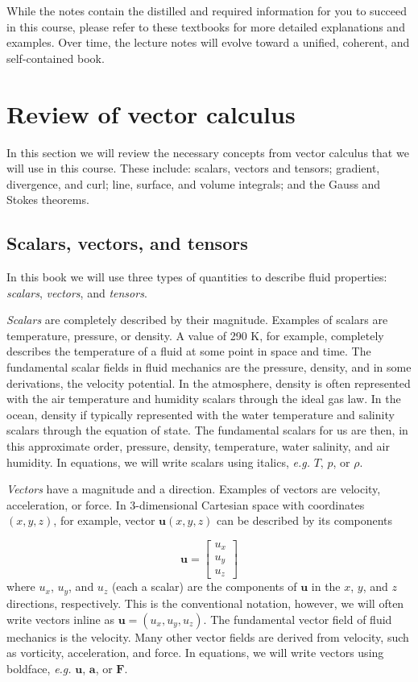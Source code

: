 \documentclass[12pt]{article}
\numberwithin{equation}{section}
\numberwithin{figure}{section}
\numberwithin{table}{section}
\begin{document}
While the notes contain the distilled and required information for you to
succeed in this course, please refer to these textbooks for more detailed
explanations and examples.
Over time, the lecture notes will evolve toward a unified, coherent, and
self-contained book.

\newpage
\section{Review of vector calculus}

In this section we will review the necessary concepts from vector calculus that
we will use in this course.
These include:
scalars, vectors and tensors;
gradient, divergence, and curl;
line, surface, and volume integrals;
and the Gauss and Stokes theorems.

\subsection{Scalars, vectors, and tensors}

In this book we will use three types of quantities to describe fluid
properties: \textit{scalars}, \textit{vectors}, and \textit{tensors}.

\textit{Scalars} are completely described by their magnitude.
Examples of scalars are temperature, pressure, or density.
A value of 290 K, for example, completely describes the temperature of a fluid
at some point in space and time.
The fundamental scalar fields in fluid mechanics are the pressure, density,
and in some derivations, the velocity potential.
In the atmosphere, density is often represented with the air temperature and
humidity scalars through the ideal gas law.
In the ocean, density if typically represented with the water temperature and
salinity scalars through the equation of state.
The fundamental scalars for us are then, in this approximate order,
pressure, density, temperature, water salinity, and air humidity.
In equations, we will write scalars using italics, \textit{e.g.} $T$, $p$, or $\rho$.

\textit{Vectors} have a magnitude and a direction.
Examples of vectors are velocity, acceleration, or force.
In 3-dimensional Cartesian space with coordinates $(x, y, z)$, for example,
vector $\mathbf{u}(x,y,z)$ can be described by its components

\begin{equation}
  \mathbf{u} =
  \begin{bmatrix}
    u_x \\
    u_y \\
    u_z
  \end{bmatrix}
\end{equation}
where $u_x$, $u_y$, and $u_z$ (each a scalar) are the components of $\mathbf{u}$
in the $x$, $y$, and $z$ directions, respectively.
This is the conventional notation, however, we will often write vectors
inline as $\mathbf{u} = (u_x, u_y, u_z)$.
The fundamental vector field of fluid mechanics is the velocity.
Many other vector fields are derived from velocity, such as vorticity,
acceleration, and force.
In equations, we will write vectors using boldface, \textit{e.g.} $\mathbf{u}$,
$\mathbf{a}$, or $\mathbf{F}$.
\end{document}
